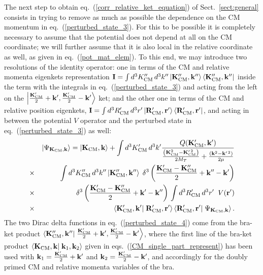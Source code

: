 \documentclass[aps,twocolumn,showpacs,preprintnumbers,amsmath,amssymb,nofootinbib,superscriptaddress,showkeys,noeprint]{revtex4-1}
\newcommand{\nk}{{\bf k}}
\newcommand{\nK}{{\bf K}}
\newcommand{\nr}{{\bf r}}
\newcommand{\nR}{{\bf R}}
\begin{document}
The next step to obtain eq.~(\ref{corr_relative_ket_equation}) of
Sect.~\ref{sect:general} consists in trying to remove as much as
possible the dependence on the CM momentum in
eq.~(\ref{perturbed_state_3}). For this to be possible it is
completely necessary to assume that the potential does not depend at
all on the CM coordinate; we will further assume that it is also local
in the relative coordinate as well, as given in
eq.~(\ref{pot_mat_elem}).  To this end, we may introduce two
resolutions of the identity operator: one in terms of the CM and
relative momenta eigenkets representation $\mathbf{I}=\int
d^3K^{\prime\prime}_{\rm CM} \, d^3k^{\prime\prime} \left|
\nK^{\prime\prime}_{\rm CM},\nk^{\prime\prime} \right\rangle
\left\langle \nK^{\prime\prime}_{\rm CM},\nk^{\prime\prime} \right|$
inside the term with the integrals in eq.~(\ref{perturbed_state_3})
and acting from the left on the $ \left| \frac{\nK^\prime_{\rm CM}}{2}
+ \nk^\prime,\frac{\nK^\prime_{\rm CM}}{2} - \nk^\prime \right\rangle$
ket; and the other one in terms of the CM and relative position
eigenkets, $\mathbf{I}=\int d^3R^{\prime}_{\rm CM} \, d^3r^{\prime}
\left| \nR^{\prime}_{\rm CM},\nr^{\prime} \right\rangle \left\langle
\nR^{\prime}_{\rm CM},\nr^{\prime} \right|$, and acting in between the
potential $V$ operator and the perturbed state in
eq.~(\ref{perturbed_state_3}) as well:
\begin{eqnarray}
&&\left| \Psi_{\nK_{\rm CM},\nk}\right\rangle=
\left| \nK_{\rm CM},\nk\right\rangle +
\int d^3K^\prime_{\rm CM} \, d^3k^\prime
\frac{Q(\nK^\prime_{\rm CM}, \nk^\prime)}{
\frac{\left( \nK^2_{\rm CM}-\nK^{\prime\,2}_{\rm CM}\right)}{2M_T} 
 + \frac{\left(\nk^2-\nk^{\prime\,2}\right)}{2\mu}}\nonumber\\
 &\times& \int d^3K^{\prime\prime}_{\rm CM} \, d^3k^{\prime\prime}
\left| \nK^{\prime\prime}_{\rm CM},\nk^{\prime\prime} \right\rangle 
\; \delta^3\left(\frac{\nK^\prime_{\rm CM}-
\nK^{\prime\prime}_{\rm CM}}{2}+ \nk^{\prime\prime}-\nk^\prime \right)
\nonumber\\
&\times&\delta^3\left(\frac{\nK^\prime_{\rm CM}-
\nK^{\prime\prime}_{\rm CM}}{2}+ \nk^{\prime}-\nk^{\prime\prime} 
\right)\, \int d^3R^{\prime}_{\rm CM} \, 
d^3r^{\prime}\; \; V(\nr^\prime) \nonumber\\
&\times& \left\langle \nK^\prime_{\rm CM}, \nk^\prime \right| \left.
\nR^\prime_{\rm CM}, \nr^\prime \right\rangle
\left\langle \nR^\prime_{\rm CM}, \nr^\prime \right| \left.
\Psi_{\nK_{\rm CM},\nk}\right\rangle. \label{perturbed_state_4}
\end{eqnarray}
The two Dirac delta functions in eq.~(\ref{perturbed_state_4}) come
from the bra-ket product $\left\langle \nK^{\prime\prime}_{\rm
  CM},\nk^{\prime\prime} \right| \left. \frac{\nK^\prime_{\rm CM}}{2}
+ \nk^\prime, \frac{\nK^\prime_{\rm CM}}{2} - \nk^\prime
\right\rangle$, where the first line of the bra-ket product
$\left\langle \nK_{\rm CM}, \nk \right| \left. \nk_1, \nk_2
\right\rangle$ given in eqs.~(\ref{CM_single_part_represent}) has been
used with $\nk_1= \frac{\nK^\prime_{\rm CM}}{2} + \nk^\prime$ and
$\nk_2= \frac{\nK^\prime_{\rm CM}}{2} - \nk^\prime$, and accordingly
for the doubly primed CM and relative momenta variables of the bra.
\end{document}

